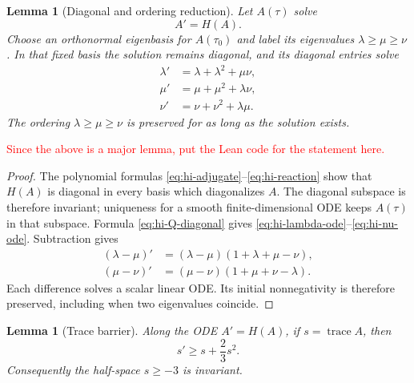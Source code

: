 \documentclass[10pt]{coll-l}
\newcommand{\trace}{\operatorname{trace}}
\newtheorem{lemma}[theorem]{Lemma}
\theoremstyle{definition}
\theoremstyle{remark}
\numberwithin{section}{chapter}
\numberwithin{equation}{chapter}
\begin{document}
\begin{lemma}[Diagonal and ordering reduction]
\label{lem:hi-ordering}
Let $A(\tau)$ solve
\[
                       A'=H(A).
\]
Choose an orthonormal eigenbasis for $A(\tau_0)$ and label its eigenvalues
$\lambda\geq\mu\geq\nu$.  In that fixed basis the solution remains
diagonal, and its diagonal entries solve
\begin{align}
 \lambda'&=\lambda+\lambda^2+\mu\nu,                       \label{eq:hi-lambda-ode}\\
 \mu'&=\mu+\mu^2+\lambda\nu,                               \label{eq:hi-mu-ode}\\
 \nu'&=\nu+\nu^2+\lambda\mu.                               \label{eq:hi-nu-ode}
\end{align}
The ordering $\lambda\geq\mu\geq\nu$ is preserved for as long as the
solution exists.
\end{lemma}

\textcolor{red}{Since the above is a major lemma, put the Lean code for the statement here.}

\begin{proof}
The polynomial formulas \eqref{eq:hi-adjugate}--\eqref{eq:hi-reaction}
show that $H(A)$ is diagonal in every basis which diagonalizes $A$.
The diagonal subspace is therefore invariant; uniqueness for a smooth
finite-dimensional ODE keeps $A(\tau)$ in that subspace.  Formula
\eqref{eq:hi-Q-diagonal} gives
\eqref{eq:hi-lambda-ode}--\eqref{eq:hi-nu-ode}.  Subtraction gives
\begin{align}
 (\lambda-\mu)'
   &=(\lambda-\mu)(1+\lambda+\mu-\nu),                    \label{eq:hi-order-one}\\
 (\mu-\nu)'
   &=(\mu-\nu)(1+\mu+\nu-\lambda).                        \label{eq:hi-order-two}
\end{align}
Each difference solves a scalar linear ODE.  Its initial nonnegativity is
therefore preserved, including when two eigenvalues coincide.
\end{proof}

\begin{lemma}[Trace barrier]
\label{lem:hi-trace-barrier}
Along the ODE $A'=H(A)$, if $s=\trace A$, then
\begin{equation}
 s'\geq s+\frac23s^2.                                     \label{eq:hi-trace-derivative}
\end{equation}
Consequently the half-space $s\geq-3$ is invariant.
\end{lemma}
\end{document}
